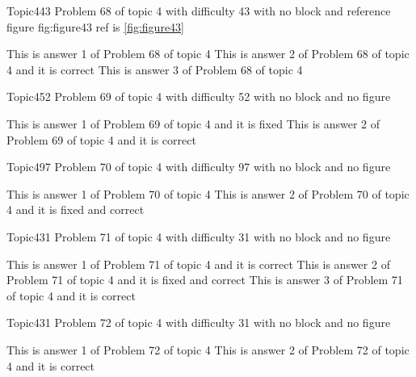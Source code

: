 \documentclass[master]{exam}
\begin{document}
\begin{problem}{Topic4}{43}
	Problem 68 of topic 4 with difficulty 43 with no block and reference figure fig:figure43 ref is \ref{fig:figure43}
	\begin{answers}
		\answer This is answer 1 of Problem 68 of topic 4 
		\answer[correct] This is answer 2 of Problem 68 of topic 4 and it is correct
		\answer This is answer 3 of Problem 68 of topic 4 
	\end{answers}
\end{problem}

\begin{problem}{Topic4}{52}
	Problem 69 of topic 4 with difficulty 52 with no block and no figure
	\begin{answers}
		\answer[fixed] This is answer 1 of Problem 69 of topic 4 and it is fixed
		\answer[correct] This is answer 2 of Problem 69 of topic 4 and it is correct
	\end{answers}
\end{problem}

\begin{problem}{Topic4}{97}
	Problem 70 of topic 4 with difficulty 97 with no block and no figure
	\begin{answers}
		\answer This is answer 1 of Problem 70 of topic 4 
		 This is answer 2 of Problem 70 of topic 4 and it is fixed and correct
	\end{answers}
\end{problem}

\begin{problem}{Topic4}{31}
	Problem 71 of topic 4 with difficulty 31 with no block and no figure
	\begin{answers}
		\answer[correct] This is answer 1 of Problem 71 of topic 4 and it is correct
		 This is answer 2 of Problem 71 of topic 4 and it is fixed and correct
		\answer[correct] This is answer 3 of Problem 71 of topic 4 and it is correct
	\end{answers}
\end{problem}

\begin{problem}{Topic4}{31}
	Problem 72 of topic 4 with difficulty 31 with no block and no figure
	\begin{answers}
		\answer This is answer 1 of Problem 72 of topic 4 
		\answer[correct] This is answer 2 of Problem 72 of topic 4 and it is correct
	\end{answers}
\end{problem}
\end{document}
